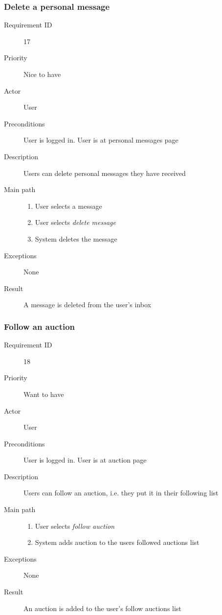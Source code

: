 		\subsubsection{Delete a personal message}
			\begin{description}
				\item[Requirement ID] 17
				\item[Priority] Nice to have
				\item[Actor] User
				\item[Preconditions] User is logged in. User is at personal messages page
				\item[Description] Users can delete personal messages they have received
				\item[Main path]
 					\begin{enumerate}
						\item User selects a message
						\item User selects \emph{delete message}
						\item System deletes the message
					\end{enumerate}
				\item[Exceptions] None
				\item[Result] A message is deleted from the user's inbox
			\end{description}
		\subsubsection{Follow an auction}
			\begin{description}
				\item[Requirement ID] 18
				\item[Priority] Want to have
				\item[Actor] User
				\item[Preconditions] User is logged in. User is at auction page
				\item[Description] Users can follow an auction, i.e. they put it in their following list
				\item[Main path]
 					\begin{enumerate}
						\item User selects \emph{follow auction}
						\item System adds auction to the users followed auctions list
					\end{enumerate}
				\item[Exceptions] None
				\item[Result] An auction is added to the user's follow auctions list
			\end{description}

